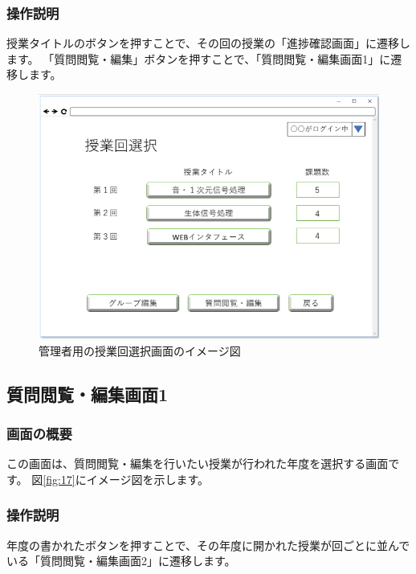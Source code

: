 \subsubsection{操作説明}
授業タイトルのボタンを押すことで、その回の授業の「進捗確認画面」に遷移します。
「質問閲覧・編集」ボタンを押すことで、「質問閲覧・編集画面1」に遷移します。

\begin{figure}[htbp]
  \begin{center}
    \includegraphics[width=0.8\linewidth,clip]{./img/16.png}
    \caption{管理者用の授業回選択画面のイメージ図}\label{fig:16}
  \end{center}
\end{figure}

\newpage

\subsection{質問閲覧・編集画面1}
\subsubsection{画面の概要}
この画面は、質問閲覧・編集を行いたい授業が行われた年度を選択する画面です。
図\ref{fig:17}にイメージ図を示します。

\subsubsection{操作説明}
年度の書かれたボタンを押すことで、その年度に開かれた授業が回ごとに並んでいる「質問閲覧・編集画面2」に遷移します。

